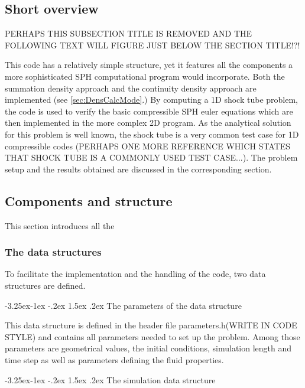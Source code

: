 \documentclass{report}
\makeatletter
\renewcommand\paragraph{\@startsection{paragraph}{4}{\z@}%
  {-3.25ex\@plus -1ex \@minus -.2ex}%
  {1.5ex \@plus .2ex}%
  {\normalfont\normalsize\bfseries}}
\makeatother
\begin{document}
\subsection{Short overview}
PERHAPS THIS SUBSECTION TITLE IS REMOVED AND THE FOLLOWING TEXT WILL FIGURE JUST BELOW THE SECTION TITLE!?!

This code has a relatively simple structure, yet it features all the components
a more sophisticated SPH computational program would incorporate. Both the summation 
density approach and the continuity density approach are implemented (see 
\ref{sec:DensCalcMode}.) By computing a 1D shock tube problem, the code is used to verify 
the basic compressible SPH euler equations which are then implemented in the more complex 2D program. 
As the analytical solution for this problem is well known, the shock tube is a very 
common test case for 1D compressible codes \cite{Sod1978} (PERHAPS ONE MORE REFERENCE WHICH STATES THAT SHOCK TUBE IS A COMMONLY USED TEST CASE...). 
The problem setup and the results obtained are discussed in the corresponding section.

\subsection{Components and structure}
\label{sec:CompAndStruc1DCode}
This section introduces all the

\subsubsection{The data structures}

To facilitate the implementation and the handling of the code, two data structures are defined. 

\paragraph{The parameters of the data structure}

This data structure is defined in the header file parameters.h(WRITE IN CODE STYLE) and 
contains all parameters needed to set up the problem. Among those parameters are 
geometrical values, the initial conditions, simulation length and time step 
as well as parameters defining the fluid properties.

\paragraph{The simulation data structure}
\end{document}
